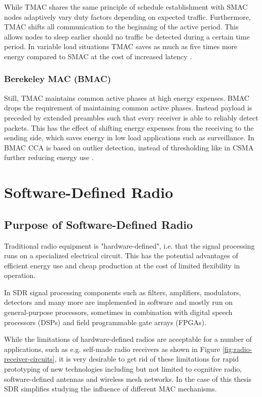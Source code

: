 While TMAC shares the same principle of schedule establishment with SMAC nodes adaptively vary duty factors depending on expected traffic. Furthermore, TMAC shifts all communication to the beginning of the active period. This allows nodes to sleep earlier should no traffic be detected during a certain time period. In variable load situations TMAC saves as much as five times more energy compared to SMAC at the cost of increased latency \cite{Bachir10}. 

\subsubsection{Berekeley MAC (BMAC)}

Still, TMAC maintains common active phases at high energy expenses. BMAC drops the requirement of maintaining common active phases. Instead payload is preceded by extended preambles such that every receiver is able to reliably detect packets. This has the effect of shifting energy expenses from the receiving to the sending side, which saves energy in low load applications such as surveillance. In BMAC CCA is based on outlier detection, instead of thresholding like in CSMA further reducing energy use \cite{Polastre04}. 

\section{Software-Defined Radio}
 
\subsection{Purpose of Software-Defined Radio}

Traditional radio equipment is "hardware-defined", i.e. that the signal processing runs on a specialized electrical circuit. This has the potential advantages of efficient energy use and cheap production at the cost of limited flexibility in operation. 

In SDR signal processing components such as filters, amplifiers, modulators, detectors and many more are implemented in software and mostly run on general-purpose processors, sometimes in combination with digital speech processors (DSPs) and field programmable gate arrays (FPGAs).

While the limitations of hardware-defined radios are acceptable for a number of applications, such as e.g. self-made radio receivers as shown in Figure \ref{fig:radio-receiver-circuits}, it is very desirable to get rid of these limitations for rapid prototyping of new technologies including but not limited to cognitive radio, software-defined antennas and wireless mesh networks. In the case of this thesis SDR simplifies studying the influence of different MAC mechanisms.

